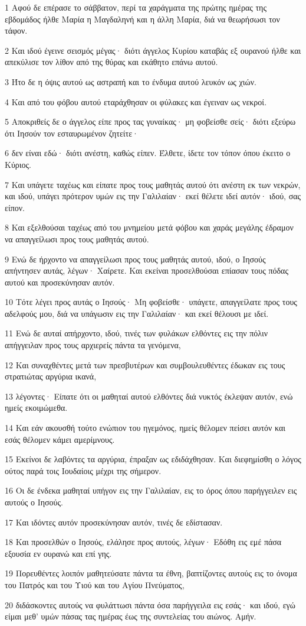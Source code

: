 \par 1 Αφού δε επέρασε το σάββατον, περί τα χαράγματα της πρώτης ημέρας της εβδομάδος ήλθε Μαρία η Μαγδαληνή και η άλλη Μαρία, διά να θεωρήσωσι τον τάφον.
\par 2 Και ιδού έγεινε σεισμός μέγας· διότι άγγελος Κυρίου καταβάς εξ ουρανού ήλθε και απεκύλισε τον λίθον από της θύρας και εκάθητο επάνω αυτού.
\par 3 Ήτο δε η όψις αυτού ως αστραπή και το ένδυμα αυτού λευκόν ως χιών.
\par 4 Και από του φόβου αυτού εταράχθησαν οι φύλακες και έγειναν ως νεκροί.
\par 5 Αποκριθείς δε ο άγγελος είπε προς τας γυναίκας· μη φοβείσθε σείς· διότι εξεύρω ότι Ιησούν τον εσταυρωμένον ζητείτε·
\par 6 δεν είναι εδώ· διότι ανέστη, καθώς είπεν. Έλθετε, ίδετε τον τόπον όπου έκειτο ο Κύριος.
\par 7 Και υπάγετε ταχέως και είπατε προς τους μαθητάς αυτού ότι ανέστη εκ των νεκρών, και ιδού, υπάγει πρότερον υμών εις την Γαλιλαίαν· εκεί θέλετε ιδεί αυτόν· ιδού, σας είπον.
\par 8 Και εξελθούσαι ταχέως από του μνημείου μετά φόβου και χαράς μεγάλης έδραμον να απαγγείλωσι προς τους μαθητάς αυτού.
\par 9 Ενώ δε ήρχοντο να απαγγείλωσι προς τους μαθητάς αυτού, ιδού, ο Ιησούς απήντησεν αυτάς, λέγων· Χαίρετε. Και εκείναι προσελθούσαι επίασαν τους πόδας αυτού και προσεκύνησαν αυτόν.
\par 10 Τότε λέγει προς αυτάς ο Ιησούς· Μη φοβείσθε· υπάγετε, απαγγείλατε προς τους αδελφούς μου, διά να υπάγωσιν εις την Γαλιλαίαν· και εκεί θέλουσι με ιδεί.
\par 11 Ενώ δε αυταί απήρχοντο, ιδού, τινές των φυλάκων ελθόντες εις την πόλιν απήγγειλαν προς τους αρχιερείς πάντα τα γενόμενα,
\par 12 Και συναχθέντες μετά των πρεσβυτέρων και συμβουλευθέντες έδωκαν εις τους στρατιώτας αργύρια ικανά,
\par 13 λέγοντες· Είπατε ότι οι μαθηταί αυτού ελθόντες διά νυκτός έκλεψαν αυτόν, ενώ ημείς εκοιμώμεθα.
\par 14 Και εάν ακουσθή τούτο ενώπιον του ηγεμόνος, ημείς θέλομεν πείσει αυτόν και εσάς θέλομεν κάμει αμερίμνους.
\par 15 Εκείνοι δε λαβόντες τα αργύρια, έπραξαν ως εδιδάχθησαν. Και διεφημίσθη ο λόγος ούτος παρά τοις Ιουδαίοις μέχρι της σήμερον.
\par 16 Οι δε ένδεκα μαθηταί υπήγον εις την Γαλιλαίαν, εις το όρος όπου παρήγγειλεν εις αυτούς ο Ιησούς.
\par 17 Και ιδόντες αυτόν προσεκύνησαν αυτόν, τινές δε εδίστασαν.
\par 18 Και προσελθών ο Ιησούς, ελάλησε προς αυτούς, λέγων· Εδόθη εις εμέ πάσα εξουσία εν ουρανώ και επί γης.
\par 19 Πορευθέντες λοιπόν μαθητεύσατε πάντα τα έθνη, βαπτίζοντες αυτούς εις το όνομα του Πατρός και του Υιού και του Αγίου Πνεύματος,
\par 20 διδάσκοντες αυτούς να φυλάττωσι πάντα όσα παρήγγειλα εις εσάς· και ιδού, εγώ είμαι μεθ' υμών πάσας τας ημέρας έως της συντελείας του αιώνος. Αμήν.


